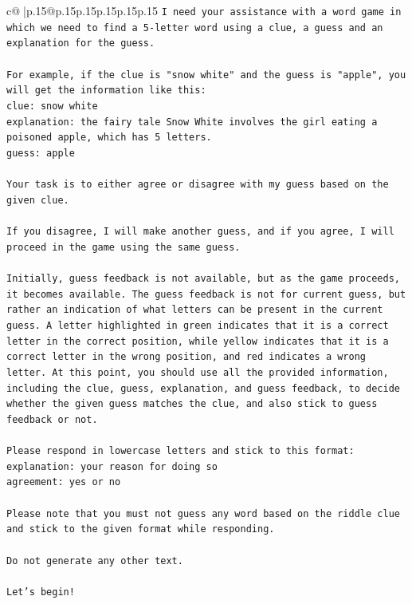 \documentclass{article}
\begin{document}
{\begin{supertabular}{c@{$\;$}|p{.15\linewidth}@{}p{.15\linewidth}p{.15\linewidth}p{.15\linewidth}p{.15\linewidth}p{.15\linewidth}}
{{{\texttt{I need your assistance with a word game in which we need to find a 5{-}letter word using a clue, a guess and an explanation for the guess.} \\
\\ 
\texttt{For example, if the clue is "snow white" and the guess is "apple", you will get the information like this:} \\
\texttt{clue: snow white} \\
\texttt{explanation: the fairy tale Snow White involves the girl eating a poisoned apple, which has 5 letters.} \\
\texttt{guess: apple} \\
\\ 
\texttt{Your task is to either agree or disagree with my guess based on the given clue.} \\
\\ 
\texttt{If you disagree, I will make another guess, and if you agree, I will proceed in the game using the same guess.} \\
\\ 
\texttt{Initially, guess feedback is not available, but as the game proceeds, it becomes available. The guess feedback is not for current guess, but rather an indication of what letters can be present in the current guess. A letter highlighted in green indicates that it is a correct letter in the correct position, while yellow indicates that it is a correct letter in the wrong position, and red indicates a wrong letter. At this point, you should use all the provided information, including the clue, guess, explanation, and guess feedback, to decide whether the given guess matches the clue, and also stick to guess feedback or not.} \\
\\ 
\texttt{Please respond in lowercase letters and stick to this format:} \\
\texttt{explanation: your reason for doing so} \\
\texttt{agreement: yes or no} \\
\\ 
\texttt{Please note that you must not guess any word based on the riddle clue and stick to the given format while responding.} \\
\\ 
\texttt{Do not generate any other text.} \\
\\ 
\texttt{Let's begin!} \\
\\ 
}}}
\end{supertabular}}
\end{document}
